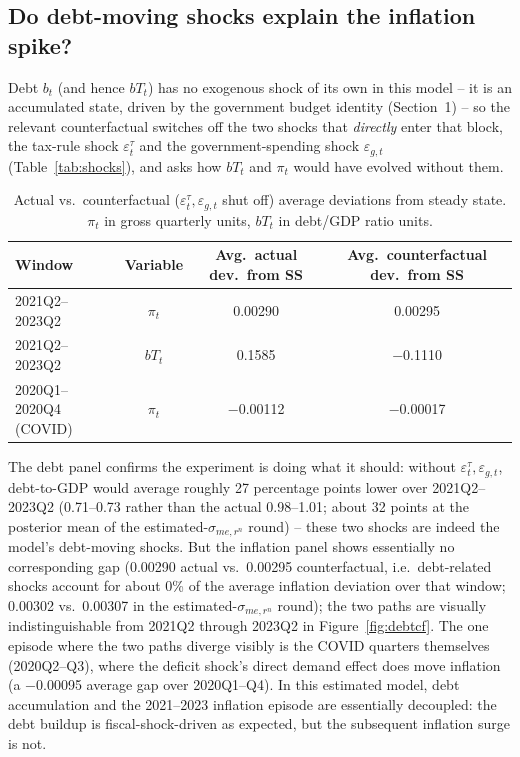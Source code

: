 \documentclass[11pt]{article}
\begin{document}
\subsection{Do debt-moving shocks explain the inflation spike?}
\label{sec:cf-debt}

Debt $b_t$ (and hence $bT_t$) has no exogenous shock of its own in this
model -- it is an accumulated state, driven by the government budget
identity (Section~1) -- so the relevant counterfactual switches off the
two shocks that \emph{directly} enter that block, the tax-rule shock
$\varepsilon^\tau_t$ and the government-spending shock $\varepsilon_{g,t}$
(Table~\ref{tab:shocks}), and asks how $bT_t$ and $\pi_t$ would have
evolved without them.

\begin{table}[h]
\centering
\small
\begin{tabular}{@{}lccc@{}}
\toprule
Window & Variable & Avg.\ actual dev.\ from SS & Avg.\ counterfactual dev.\ from SS \\
\midrule
2021Q2--2023Q2 & $\pi_t$ & 0.00290 & 0.00295 \\
2021Q2--2023Q2 & $bT_t$ & 0.1585 & $-$0.1110 \\
2020Q1--2020Q4 (COVID) & $\pi_t$ & $-$0.00112 & $-$0.00017 \\
\bottomrule
\end{tabular}
\caption{Actual vs.\ counterfactual ($\varepsilon^\tau_t,\varepsilon_{g,t}$ shut off) average deviations from steady state. $\pi_t$ in gross quarterly units, $bT_t$ in debt/GDP ratio units.}
\label{tab:cf-debt}
\end{table}

The debt panel confirms the experiment is doing what it should: without
$\varepsilon^\tau_t,\varepsilon_{g,t}$, debt-to-GDP would average roughly
27 percentage points lower over 2021Q2--2023Q2 (0.71--0.73 rather than the
actual 0.98--1.01; about 32 points at the posterior mean of the
estimated-$\sigma_{me,r^n}$ round) -- these two shocks are indeed the model's debt-moving
shocks. But the inflation panel shows essentially no corresponding gap
(0.00290 actual vs.\ 0.00295 counterfactual, i.e.\ debt-related shocks
account for about 0\% of the average inflation deviation over that
window; 0.00302 vs.\ 0.00307 in the estimated-$\sigma_{me,r^n}$ round); the two paths are visually indistinguishable from 2021Q2 through
2023Q2 in Figure~\ref{fig:debtcf}. The one episode where the two paths
diverge visibly is the COVID quarters themselves (2020Q2--Q3), where the
deficit shock's direct demand effect does move inflation (a
$-$0.00095 average gap over 2020Q1--Q4). In this estimated model, debt
accumulation and the 2021--2023 inflation episode are essentially
decoupled: the debt buildup is fiscal-shock-driven as expected, but the
subsequent inflation surge is not.
\end{document}
